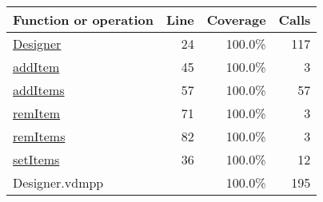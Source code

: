 \bigskip
\begin{longtable}{|l|r|r|r|}
\hline
Function or operation & Line & Coverage & Calls \\
\hline
\hline
\hyperref[Designer:24]{Designer} & 24&100.0\% & 117 \\
\hline
\hyperref[addItem:45]{addItem} & 45&100.0\% & 3 \\
\hline
\hyperref[addItems:57]{addItems} & 57&100.0\% & 57 \\
\hline
\hyperref[remItem:71]{remItem} & 71&100.0\% & 3 \\
\hline
\hyperref[remItems:82]{remItems} & 82&100.0\% & 3 \\
\hline
\hyperref[setItems:36]{setItems} & 36&100.0\% & 12 \\
\hline
\hline
Designer.vdmpp & & 100.0\% & 195 \\
\hline
\end{longtable}

